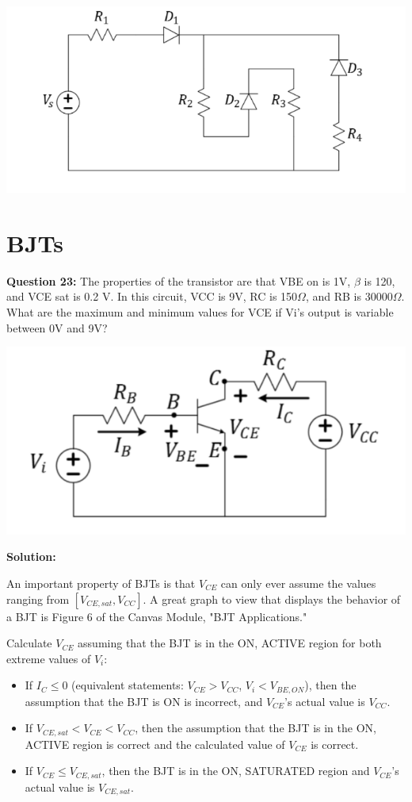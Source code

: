 \documentclass{article}
\begin{document}
\begin{center}
    \includegraphics[width=0.75\linewidth]{figures/46.png}
\end{center}

\pagebreak

\section*{BJTs}
\textbf{Question 23:} The properties of the transistor are that VBE on is 1V, \(\beta\) is 120, and VCE sat is 0.2 V. In this circuit, VCC is 9V, RC is 150\(\Omega\), and RB is 30000\(\Omega\). What are the maximum and minimum values for VCE if Vi’s output is variable between 0V and 9V?

\begin{center}

    \includegraphics[width=0.75\linewidth]{figures/56.png}
\end{center}

\textbf{Solution:} 

An important property of BJTs is that $V_{CE}$ can only ever assume the values ranging from $[V_{CE,sat},V_{CC}]$. A great graph to view that displays the behavior of a BJT is Figure 6 of the Canvas Module, "BJT Applications."

Calculate $V_{CE}$ assuming that the BJT is in the ON, ACTIVE region for both extreme values of $V_i$:
\begin{itemize}
    \item If $I_C \le 0$ (equivalent statements: $V_{CE} > V_{CC}$, $V_i < V_{BE,ON}$), then the assumption that the BJT is ON is incorrect, and $V_{CE}$'s actual value is $V_{CC}$.
    \item If $V_{CE,sat} < V_{CE} < V_{CC}$, then the assumption that the BJT is in the ON, ACTIVE region is correct and the calculated value of $V_{CE}$ is correct.
    \item If $V_{CE} \le V_{CE,sat}$, then the BJT is in the ON, SATURATED region and $V_{CE}$'s actual value is $V_{CE,sat}$.
\end{itemize}
\end{document}
